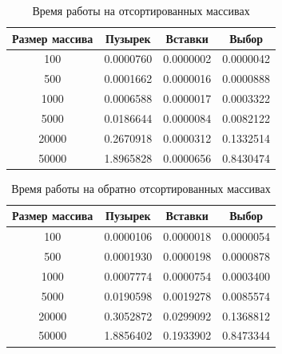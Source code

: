 \documentclass[a4paper,12pt]{article}
\begin{document}
	\begin{table}[H]
	\caption{\label{tabular:test_time1} Время работы на отсортированных массивах}
	\begin{center}	    
	\begin{tabular}{|c|c|c|c|}        				
        				\hline
        				Размер массива & Пузырек & Вставки & Выбор       \\ 
        				\hline
        				100    &0.0000760 &0.0000002 &0.0000042\\ 
        				500    &0.0001662 &0.0000016 &0.0000888\\
        				1000   &0.0006588 &0.0000017 &0.0003322\\ 
        				5000   &0.0186644 &0.0000084 &0.0082122\\
        				20000  &0.2670918 &0.0000312 &0.1332514\\
        				50000  &1.8965828 &0.0000656 &0.8430474\\
        				\hline
	\end{tabular}
	\end{center}
	\end{table}	

	\begin{table}[H]
	\caption{\label{tabular:test_time2} Время работы на обратно отсортированных массивах}
	\begin{center}	    
	\begin{tabular}{|c|c|c|c|}        				
        				\hline
        				Размер массива & Пузырек & Вставки & Выбор       \\ 
        				\hline
        				100    &0.0000106 &0.0000018 &0.0000054\\ 
        				500    &0.0001930 &0.0000198 &0.0000878\\
        				1000   &0.0007774 &0.0000754 &0.0003400\\ 
        				5000   &0.0190598 &0.0019278 &0.0085574\\
        				20000  &0.3052872 &0.0299092 &0.1368812\\
        				50000  &1.8856402 &0.1933902 &0.8473344\\
        				\hline
	\end{tabular}
	\end{center}
	\end{table}
	
\end{document}
